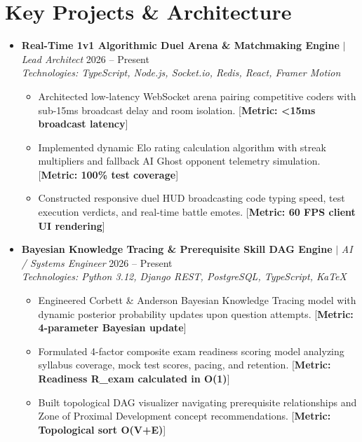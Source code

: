 \documentclass[letterpaper,10pt]{article}
\begin{document}
\section{Key Projects \& Architecture}
\begin{itemize}[leftmargin=0.15in, label={}]
  \item
    \textbf{Real-Time 1v1 Algorithmic Duel Arena \& Matchmaking Engine} $|$ \textit{Lead Architect} \hfill \small{2026 – Present} \\
    \textit{\small Technologies: TypeScript, Node.js, Socket.io, Redis, React, Framer Motion}
    \begin{itemize}[leftmargin=0.2in, label={$\circ$}]
      \item \small{Architected low-latency WebSocket arena pairing competitive coders with sub-15ms broadcast delay and room isolation. [\textbf{Metric: <15ms broadcast latency}]}
      \item \small{Implemented dynamic Elo rating calculation algorithm with streak multipliers and fallback AI Ghost opponent telemetry simulation. [\textbf{Metric: 100\% test coverage}]}
      \item \small{Constructed responsive duel HUD broadcasting code typing speed, test execution verdicts, and real-time battle emotes. [\textbf{Metric: 60 FPS client UI rendering}]}
    \end{itemize}
  \item
    \textbf{Bayesian Knowledge Tracing \& Prerequisite Skill DAG Engine} $|$ \textit{AI / Systems Engineer} \hfill \small{2026 – Present} \\
    \textit{\small Technologies: Python 3.12, Django REST, PostgreSQL, TypeScript, KaTeX}
    \begin{itemize}[leftmargin=0.2in, label={$\circ$}]
      \item \small{Engineered Corbett \& Anderson Bayesian Knowledge Tracing model with dynamic posterior probability updates upon question attempts. [\textbf{Metric: 4-parameter Bayesian update}]}
      \item \small{Formulated 4-factor composite exam readiness scoring model analyzing syllabus coverage, mock test scores, pacing, and retention. [\textbf{Metric: Readiness R\_exam calculated in O(1)}]}
      \item \small{Built topological DAG visualizer navigating prerequisite relationships and Zone of Proximal Development concept recommendations. [\textbf{Metric: Topological sort O(V+E)}]}
    \end{itemize}

\end{itemize}
\end{document}
